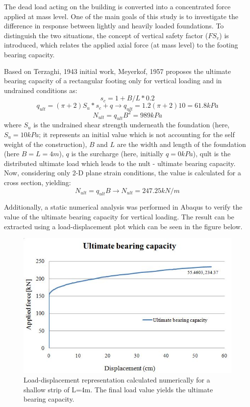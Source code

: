	The dead load acting on the building is converted into a concentrated force applied at mass level. One of the main goals of this study is to investigate the difference in response between lightly and heavily loaded foundations. To distinguish the two situations, the concept of vertical safety factor ($FS_v$) is introduced, which relates the applied axial force (at mass level) to the footing bearing capacity.
	
	Based on Terzaghi, 1943 initial work, Meyerkof, 1957\cite{meyerhof1957ultimate} proposes the ultimate bearing capacity of a rectangular footing only for vertical loading and in undrained conditions as:
	\begin{equation}
		s_c=1+B/L*0.2
	\end{equation}
	\begin{equation}
		q_{ult}=(\pi +2)S_u*s_c + q \longrightarrow q_{ult}=1.2 (\pi+2) 10= 61.8kPa
	\end{equation}
	\begin{equation}
		N_{ult}=q_{ult} B^2=989 kPa
	\end{equation}
	where $S_u$ is the undrained shear strength underneath the foundation (here, $S_u=10kPa$; it represents an initial value which is not accounting for the self weight of the construction), $B$ and $L$ are the width and length of the foundation (here $B=L=4m$), $q$ is the surcharge (here, initially $q=0kPa$), \gls{qult} is the distributed ultimate load which leads to the \gls{nult} - ultimate bearing capacity. Now, considering only 2-D plane strain conditions, the value is calculated for a cross section, yielding:
	\begin{equation}
		N_{ult}=q_{ult} B \longrightarrow N_{ult}=247.25 kN/m
	\end{equation}
	
	Additionally, a static numerical analysis was performed in Abaqus to verify the value of the ultimate bearing capacity for vertical loading. The result can be extracted using a load-displacement plot which can be seen in the figure below.


		\begin{figure}[!h]
			\centering
			\includegraphics[width=0.5\linewidth]{"ultimatebearing"}
			\caption{Load-displacement representation calculated numerically for a shallow strip of L=4m. The final load value yields the ultimate bearing capacity. }
			\label{bearing}
		\end{figure}

